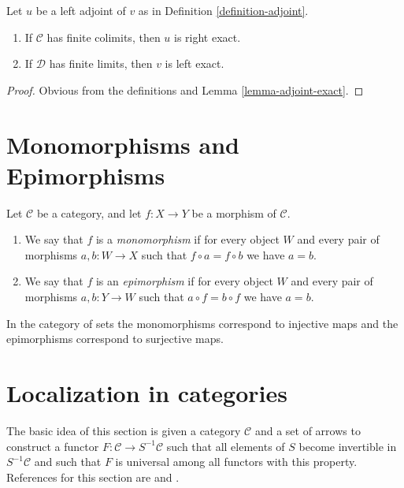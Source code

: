 \begin{lemma}
\label{lemma-exact-adjoint}
Let $u$ be a left adjoint of $v$ as in Definition \ref{definition-adjoint}.
\begin{enumerate}
\item If $\mathcal{C}$ has finite colimits, then $u$ is right exact.
\item If $\mathcal{D}$ has finite limits, then $v$ is left exact.
\end{enumerate}
\end{lemma}

\begin{proof}
Obvious from the definitions and Lemma \ref{lemma-adjoint-exact}.
\end{proof}


\section{Monomorphisms and Epimorphisms}
\label{section-mono-epi}

\begin{definition}
\label{definition-mono-epi}
Let $\mathcal{C}$ be a category, and let $f : X \to Y$ be
a morphism of $\mathcal{C}$.
\begin{enumerate}
\item We say that $f$ is a {\it monomorphism} if for every object
$W$ and every pair of morphisms $a, b : W \to X$ such that
$f \circ a = f \circ b$ we have $a = b$.
\item We say that $f$ is an {\it epimorphism} if for every object
$W$ and every pair of morphisms $a, b : Y \to W$ such that
$a \circ f = b \circ f$ we have $a = b$.
\end{enumerate}
\end{definition}

\begin{example}
\label{example-mono-epi-sets}
In the category of sets the monomorphisms correspond to injective
maps and the epimorphisms correspond to surjective maps.
\end{example}





\section{Localization in categories}
\label{section-localization}

\noindent
The basic idea of this section is given a category $\mathcal{C}$
and a set of arrows to construct a functor
$F : \mathcal{C} \to S^{-1}\mathcal{C}$
such that all elements of $S$ become invertible in $S^{-1}\mathcal{C}$
and such that $F$ is universal among all functors with this property.
References for this section are \cite[Chapter I, Section 2]{GZ}
and \cite[Chapter II, Section 2]{Verdier}.

